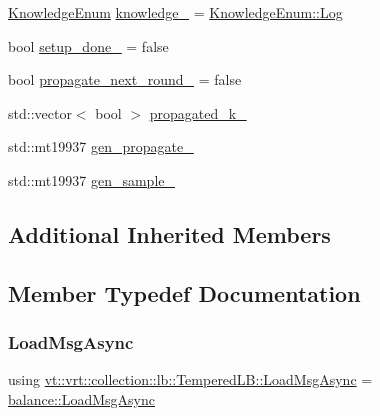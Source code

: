 \begin{DoxyCompactItemize}
\item 
\hyperlink{namespacevt_1_1vrt_1_1collection_1_1lb_a72b44c7e6b2052509331d57b9c94c84a}{Knowledge\+Enum} \hyperlink{structvt_1_1vrt_1_1collection_1_1lb_1_1_tempered_l_b_a4b6087104debbccb5396cb96a599767f}{knowledge\+\_\+} = \hyperlink{namespacevt_1_1vrt_1_1collection_1_1lb_a72b44c7e6b2052509331d57b9c94c84aace0be71e33226e4c1db2bcea5959f16b}{Knowledge\+Enum\+::\+Log}
\item 
bool \hyperlink{structvt_1_1vrt_1_1collection_1_1lb_1_1_tempered_l_b_a79d43538cf3aa0958351404db0753050}{setup\+\_\+done\+\_\+} = false
\item 
bool \hyperlink{structvt_1_1vrt_1_1collection_1_1lb_1_1_tempered_l_b_a64d34e82497889a4d3277f0cb79aa7e1}{propagate\+\_\+next\+\_\+round\+\_\+} = false
\item 
std\+::vector$<$ bool $>$ \hyperlink{structvt_1_1vrt_1_1collection_1_1lb_1_1_tempered_l_b_aed0424ef21a6f06193eaf0f247215836}{propagated\+\_\+k\+\_\+}
\item 
std\+::mt19937 \hyperlink{structvt_1_1vrt_1_1collection_1_1lb_1_1_tempered_l_b_a449632c461159209add8e135b30f3d4f}{gen\+\_\+propagate\+\_\+}
\item 
std\+::mt19937 \hyperlink{structvt_1_1vrt_1_1collection_1_1lb_1_1_tempered_l_b_a714777ab4aebef961c51e38cac9477af}{gen\+\_\+sample\+\_\+}
\end{DoxyCompactItemize}
\subsection*{Additional Inherited Members}


\subsection{Member Typedef Documentation}
\mbox{\label{structvt_1_1vrt_1_1collection_1_1lb_1_1_tempered_l_b_a38d9ad7e92612cdbdf564b6f49b516a7}} 
\subsubsection{\texorpdfstring{Load\+Msg\+Async}{LoadMsgAsync}}
{\footnotesize\ttfamily using \hyperlink{structvt_1_1vrt_1_1collection_1_1lb_1_1_tempered_l_b_a38d9ad7e92612cdbdf564b6f49b516a7}{vt\+::vrt\+::collection\+::lb\+::\+Tempered\+L\+B\+::\+Load\+Msg\+Async} =  \hyperlink{structvt_1_1vrt_1_1collection_1_1balance_1_1_load_msg_async}{balance\+::\+Load\+Msg\+Async}}

